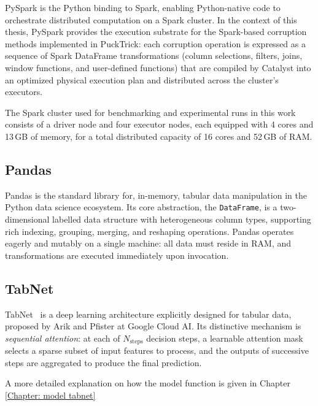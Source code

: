 \documentclass[../main.tex]{subfiles}
\begin{document}
PySpark is the Python binding to Spark, enabling Python-native code to orchestrate distributed computation on a Spark cluster. In the context of this thesis, PySpark provides the execution substrate for the Spark-based corruption methods implemented in PuckTrick: each corruption operation is expressed as a sequence of Spark DataFrame transformations (column selections, filters, joins, window functions, and user-defined functions)  that are compiled by Catalyst into an optimized physical execution plan and distributed across the cluster's executors.

The Spark cluster used for benchmarking and experimental runs in this work
consists of a driver node and four executor nodes, each equipped with 4 cores
and 13\,GB of memory, for a total distributed capacity of 16 cores and 52\,GB
of RAM.


\subsection{Pandas}
\label{sec:tech-pandas}

Pandas is the standard library for, in-memory, tabular data 
manipulation in the Python data science ecosystem.  Its
core abstraction, the \texttt{DataFrame}, is a two-dimensional labelled data
structure with heterogeneous column types, supporting rich indexing, grouping,
merging, and reshaping operations.  Pandas operates eagerly and mutably on a
single machine: all data must reside in RAM, and transformations are executed
immediately upon invocation.

\newpage
\subsection{TabNet}
\label{sec:tech-tabnet}

TabNet~\supercite{arik2021tabnet} is a deep learning architecture explicitly designed for tabular data, proposed by Arik and Pfister at Google Cloud AI.  Its distinctive mechanism is \emph{sequential attention}: at each of $N_{\text{steps}}$ decision steps, a learnable attention mask selects a sparse subset of input features to process, and the outputs of successive steps are aggregated to produce the final prediction.

A more detailed explanation on how the model function is given in Chapter \ref{Chapter: model tabnet}
\end{document}

